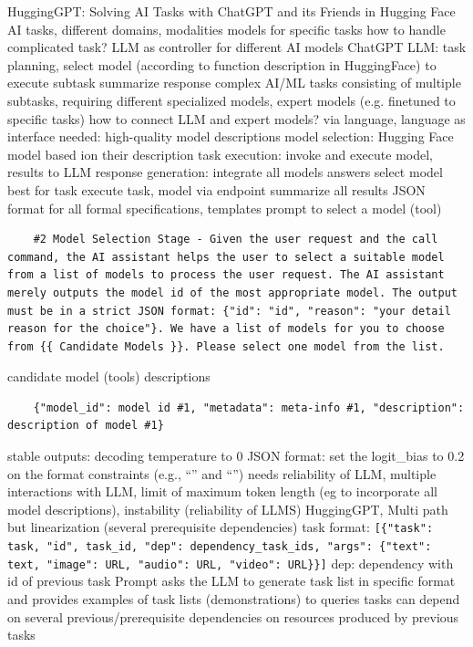 \documentclass{article}
\begin{document}
\cite{shen_hugginggpt_2023} HuggingGPT: Solving AI Tasks with ChatGPT and its Friends in Hugging Face
AI tasks, different domains, modalities
models for specific tasks
how to handle complicated task?
LLM as controller for different AI models
ChatGPT
LLM: task planning, 
select model (according to function description in HuggingFace) to execute subtask
summarize response
complex AI/ML tasks consisting of multiple subtasks, requiring different specialized models, expert models (e.g. finetuned to specific tasks)
how to connect LLM and expert models? via language, language as interface
needed: high-quality model descriptions
model selection: Hugging Face model based ion their description
task execution: invoke and execute model, results to LLM
response generation: integrate all models answers
select model best for task
execute task, model via endpoint
summarize all results
JSON format for all formal specifications, templates
prompt to select a model (tool)
\begin{verbatim}
	#2 Model Selection Stage - Given the user request and the call command, the AI assistant helps the user to select a suitable model from a list of models to process the user request. The AI assistant merely outputs the model id of the most appropriate model. The output must be in a strict JSON format: {"id": "id", "reason": "your detail reason for the choice"}. We have a list of models for you to choose from {{ Candidate Models }}. Please select one model from the list.
\end{verbatim}
candidate model (tools) descriptions
\begin{verbatim}
	{"model_id": model id #1, "metadata": meta-info #1, "description": description of model #1}
\end{verbatim}
stable outputs: decoding temperature to 0
JSON format: set the logit\_bias to 0.2 on the format constraints (e.g., “{” and “}”)
needs reliability of LLM, multiple interactions with LLM, limit of maximum token length (eg to incorporate all model descriptions), instability (reliability of LLMS)
\cite{shen_hugginggpt_2023} HuggingGPT, Multi path but linearization (several prerequisite dependencies)
task format: \verb|[{"task": task, "id", task_id, "dep": dependency_task_ids, "args": {"text": text, "image": URL, "audio": URL, "video": URL}}]|
dep: dependency with id of previous task
Prompt asks the LLM to generate task list in specific format and provides examples of task lists (demonstrations) to queries
tasks can depend on several previous/prerequisite dependencies on resources produced by previous tasks
\end{document}
